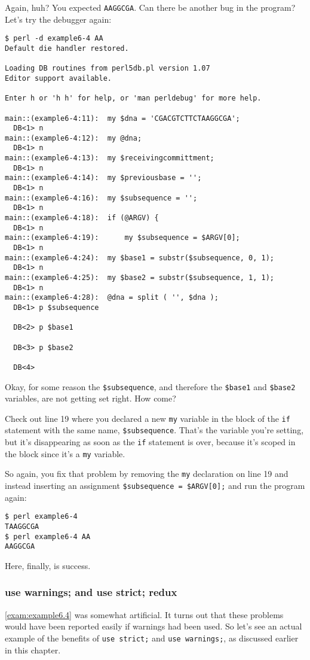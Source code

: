 Again, huh? You expected \verb|AAGGCGA|. Can there be another bug in the program? Let's try the debugger again:

\begin{lstlisting}
$ perl -d example6-4 AA
Default die handler restored.

Loading DB routines from perl5db.pl version 1.07
Editor support available.

Enter h or 'h h' for help, or 'man perldebug' for more help.

main::(example6-4:11):	my $dna = 'CGACGTCTTCTAAGGCGA';
  DB<1> n
main::(example6-4:12):	my @dna;
  DB<1> n
main::(example6-4:13):	my $receivingcommittment;
  DB<1> n
main::(example6-4:14):	my $previousbase = ''; 
  DB<1> n
main::(example6-4:16):	my $subsequence = '';
  DB<1> n
main::(example6-4:18):	if (@ARGV) {
  DB<1> n
main::(example6-4:19):	    my $subsequence = $ARGV[0];
  DB<1> n
main::(example6-4:24):	my $base1 = substr($subsequence, 0, 1);
  DB<1> n
main::(example6-4:25):	my $base2 = substr($subsequence, 1, 1);
  DB<1> n
main::(example6-4:28):	@dna = split ( '', $dna );
  DB<1> p $subsequence

  DB<2> p $base1

  DB<3> p $base2

  DB<4> 
\end{lstlisting}

Okay, for some reason the \verb|$subsequence|, and therefore the \verb|$base1| and \verb|$base2| variables, are not getting set right. How come?

Check out line 19 where you declared a new \verb|my| variable in the block of the \verb|if| statement with the same name, \verb|$subsequence|. That's the variable you're setting, but it's disappearing as soon as the \verb|if| statement is over, because it's scoped in the block since it's a \verb|my| variable.

So again, you fix that problem by removing the \verb|my| declaration on line 19 and instead inserting an assignment \verb|$subsequence = $ARGV[0];| and run the program again:

\begin{lstlisting}
$ perl example6-4
TAAGGCGA
$ perl example6-4 AA
AAGGCGA 
\end{lstlisting}

Here, finally, is success.

\subsubsection{use warnings; and use strict; redux}
\autoref{exam:example6.4} was somewhat artificial. It turns out that these problems would have been reported easily if warnings had been used. So let's see an actual example of the benefits of \verb|use strict;| and \verb|use warnings;|, as discussed earlier in this chapter.

